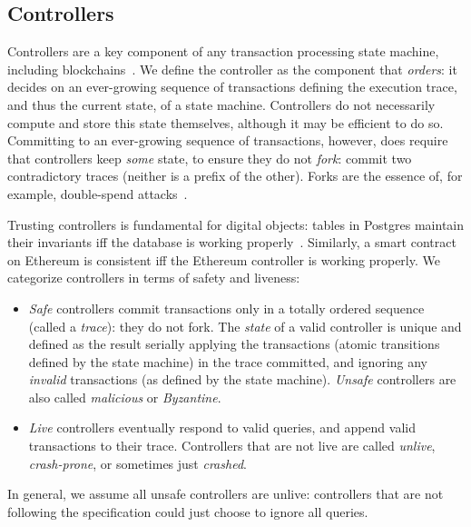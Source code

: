 \documentclass[a4paper,USenglish,cleveref, autoref, thm-restate, anonymous]{lipics-v2021}
\begin{document}
\subsection{Controllers}  
Controllers are a key component of any transaction processing state machine, including blockchains~\cite{smr,statemachine}.
We define the controller as the component that \emph{orders}: it decides on an ever-growing sequence of transactions defining the execution trace, and thus the current state, of a state machine.
Controllers do not necessarily compute and store this state themselves, although it may be efficient to do so.
Committing to an ever-growing sequence of transactions, however, does require that controllers keep \textit{some} state, to ensure they do not \emph{fork}: commit two contradictory traces (neither is a prefix of the other).
Forks are the essence of, for example, double-spend attacks~\cite{Abraham2017}.

Trusting controllers is fundamental for digital objects: tables in Postgres maintain their invariants iff the database is working properly~\cite{citation-needed}.
Similarly, a smart contract on Ethereum is consistent iff the Ethereum controller is working properly\cite{citation-needed?}.
We categorize controllers in terms of safety and liveness:
\begin{itemize}
\item \emph{Safe} controllers commit transactions only in a totally ordered sequence (called a \emph{trace}): they do not fork.
The \emph{state} of a valid controller is unique and defined as the result serially applying the transactions (atomic transitions defined by the state machine) in the trace committed, and ignoring any \emph{invalid} transactions (as defined by the state machine).
  \emph{Unsafe} controllers are also called \emph{malicious} or \emph{Byzantine}.  
\item \emph{Live} controllers eventually respond to valid queries, and append valid transactions to their trace.
  Controllers that are not live are called \emph{unlive}, \emph{crash-prone}, or sometimes just \emph{crashed}.
\end{itemize}
In general, we assume all unsafe controllers are unlive: controllers that are not following the specification could just choose to ignore all queries.
\end{document}
